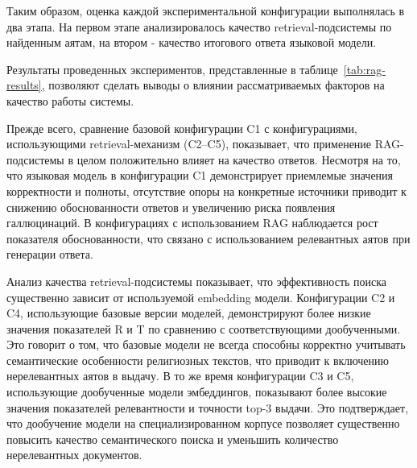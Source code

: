 Таким образом, оценка каждой экспериментальной конфигурации выполнялась в два этапа. На первом этапе анализировалось качество retrieval-подсистемы по найденным аятам, на втором - качество итогового ответа языковой модели.

\begin{table}[H]
	\centering
	\caption{Результаты тестирования конфигураций RAG}
	\label{tab:rag-results}
	\small
\end{table}


Результаты проведенных экспериментов, представленные в таблице~\ref{tab:rag-results}, позволяют сделать выводы о влиянии рассматриваемых факторов на качество работы системы.


Прежде всего, сравнение базовой конфигурации C1 с конфигурациями, использующими retrieval-механизм (C2--C5), показывает, что применение RAG-подсистемы в целом положительно влияет на качество ответов. Несмотря на то, что языковая модель в конфигурации C1 демонстрирует приемлемые значения корректности и полноты, отсутствие опоры на конкретные источники приводит к снижению обоснованности ответов и увеличению риска появления галлюцинаций. В конфигурациях с использованием RAG наблюдается рост показателя обоснованности, что связано с использованием релевантных аятов при генерации ответа.


Анализ качества retrieval-подсистемы показывает, что эффективность поиска существенно зависит от используемой embedding модели. Конфигурации C2 и C4, использующие базовые версии моделей, демонстрируют более низкие значения показателей R и T по сравнению с соответствующими дообученными. Это говорит о том, что базовые модели не всегда способны корректно учитывать семантические особенности религиозных текстов, что приводит к включению нерелевантных аятов в выдачу. В то же время конфигурации C3 и C5, использующие дообученные модели эмбеддингов, показывают более высокие значения показателей релевантности и точности top-3 выдачи. Это подтверждает, что дообучение модели на специализированном корпусе позволяет существенно повысить качество семантического поиска и уменьшить количество нерелевантных документов.


